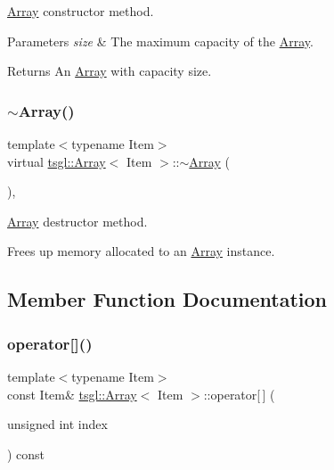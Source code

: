 \hyperlink{classtsgl_1_1_array}{Array} constructor method. 


\begin{DoxyParams}{Parameters}
{\em size} & The maximum capacity of the \hyperlink{classtsgl_1_1_array}{Array}. \\
\hline
\end{DoxyParams}
\begin{DoxyReturn}{Returns}
An \hyperlink{classtsgl_1_1_array}{Array} with capacity {\ttfamily size}. 
\end{DoxyReturn}
\mbox{\label{classtsgl_1_1_array_aeef4dedf813a5bac862e19c55dee9069}} 
\subsubsection{\texorpdfstring{$\sim$\+Array()}{~Array()}}
{\footnotesize\ttfamily template$<$typename Item$>$ \\
virtual \hyperlink{classtsgl_1_1_array}{tsgl\+::\+Array}$<$ Item $>$\+::$\sim$\hyperlink{classtsgl_1_1_array}{Array} (\begin{DoxyParamCaption}{ }\end{DoxyParamCaption})\hspace{0.3cm}{\ttfamily [inline]}, {\ttfamily [virtual]}}



\hyperlink{classtsgl_1_1_array}{Array} destructor method. 

Frees up memory allocated to an \hyperlink{classtsgl_1_1_array}{Array} instance. 

\subsection{Member Function Documentation}
\mbox{\label{classtsgl_1_1_array_acd182e906a6942eecdd30e455bed1fb1}} 
\subsubsection{\texorpdfstring{operator[]()}{operator[]()}\hspace{0.1cm}{\footnotesize\ttfamily [1/2]}}
{\footnotesize\ttfamily template$<$typename Item$>$ \\
const Item\& \hyperlink{classtsgl_1_1_array}{tsgl\+::\+Array}$<$ Item $>$\+::operator\mbox{[}$\,$\mbox{]} (\begin{DoxyParamCaption}\item[{unsigned int}]{index }\end{DoxyParamCaption}) const\hspace{0.3cm}{\ttfamily [inline]}}



